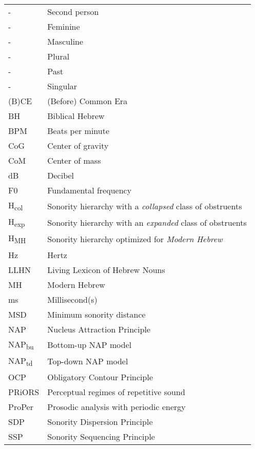 \addchap{\lsAbbreviationsTitle}

\begin{tabularx}{.9\textwidth}{lQ}

-\Second{} & Second person\\
-\F{} & Feminine\\
-\M{} & Masculine\\
-\Pl{} & Plural\\
-\Pst{} & Past\\
-\Sg{} & Singular\\
(B)CE & (Before) Common Era\\
BH & Biblical Hebrew\\
BPM & Beats per minute\\
CoG & Center of gravity\\
CoM & Center of mass\\
dB & Decibel\\
F0 & Fundamental frequency\\
H\textsubscript{col} & Sonority hierarchy with a \emph{collapsed} class of obstruents\\
H\textsubscript{exp} & Sonority hierarchy with an \emph{expanded} class of obstruents\\
H\textsubscript{MH} & Sonority hierarchy optimized for \emph{Modern Hebrew}\\
Hz & Hertz\\
LLHN & Living Lexicon of Hebrew Nouns\\ 
MH & Modern Hebrew\\ 
ms & Millisecond(s)\\ 
MSD & Minimum sonority distance\\ 
NAP & Nucleus Attraction Principle\\ 
NAP\textsubscript{bu} & Bottom-up NAP model\\ 
NAP\textsubscript{td} & Top-down NAP model\\
OCP & Obligatory Contour Principle\\
PRiORS & Perceptual regimes of repetitive sound\\
ProPer & Prosodic analysis with periodic energy\\
SDP & Sonority Dispersion Principle\\
SSP & Sonority Sequencing Principle\\
\end{tabularx}
